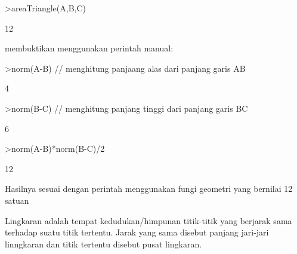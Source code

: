 \documentclass[a4paper,10pt]{article}
\begin{document}
\begin{eulernotebook}
\begin{eulercomment}
\begin{eulercomment}
\begin{eulerprompt}
>areaTriangle(A,B,C)
\end{eulerprompt}
\begin{euleroutput}
  12
\end{euleroutput}
\begin{eulercomment}
membuktikan menggunakan perintah manual:
\end{eulercomment}
\begin{eulerprompt}
>norm(A-B) // menghitung panjaang alas dari panjang garis AB 
\end{eulerprompt}
\begin{euleroutput}
  4
\end{euleroutput}
\begin{eulerprompt}
>norm(B-C) // menghitung panjang tinggi dari panjang garis BC
\end{eulerprompt}
\begin{euleroutput}
  6
\end{euleroutput}
\begin{eulerprompt}
>norm(A-B)*norm(B-C)/2
\end{eulerprompt}
\begin{euleroutput}
  12
\end{euleroutput}
\begin{eulercomment}
Hasilnya sesuai dengan perintah menggunakan fungi geometri yang
bernilai 12 satuan
\end{eulercomment}
\begin{eulercomment}
Lingkaran adalah tempat kedudukan/himpunan titik-titik yang berjarak
sama terhadap suatu titik tertentu. Jarak yang sama disebut panjang
jari-jari linngkaran dan titik tertentu disebut pusat lingkaran.


\end{eulercomment}
\end{eulercomment}
\end{eulercomment}
\end{eulernotebook}
\end{document}

